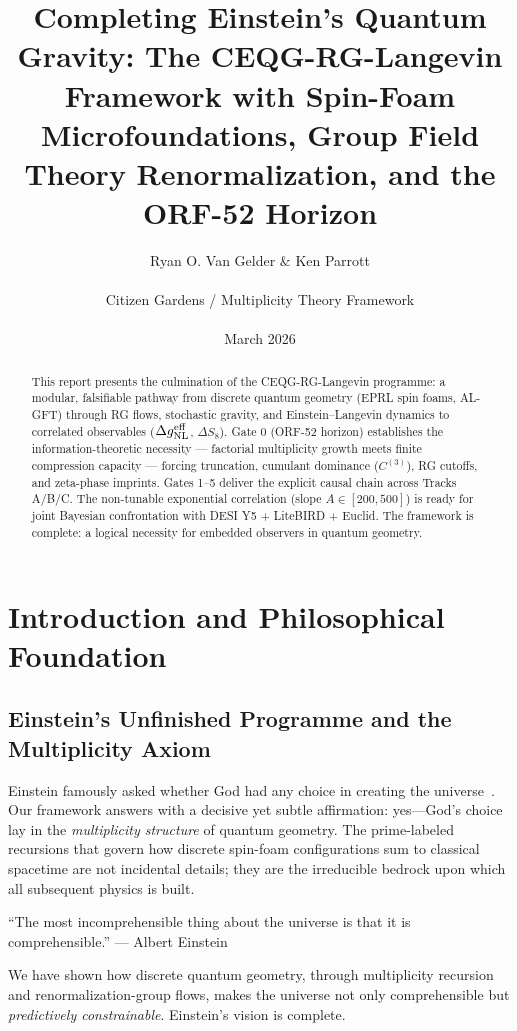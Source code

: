 \documentclass[11pt,a4paper,twoside]{article}
\title{Completing Einstein’s Quantum Gravity: The CEQG-RG-Langevin Framework with Spin-Foam Microfoundations, Group Field Theory Renormalization, and the ORF-52 Horizon}
\author{Ryan O. Van Gelder \& Ken Parrott \\ \\ Citizen Gardens / Multiplicity Theory Framework \\ \\ March 2026}
\date{}
\begin{document}
\maketitle

\begin{abstract}
This report presents the culmination of the CEQG-RG-Langevin programme: a modular, falsifiable pathway from discrete quantum geometry (EPRL spin foams, AL-GFT) through RG flows, stochastic gravity, and Einstein–Langevin dynamics to correlated observables ($\Delta g_{\rm NL}^{\rm eff}$, $\Delta S_8$). Gate 0 (ORF-52 horizon) establishes the information-theoretic necessity — factorial multiplicity growth meets finite compression capacity — forcing truncation, cumulant dominance ($C^{(3)}$), RG cutoffs, and zeta-phase imprints. Gates 1–5 deliver the explicit causal chain across Tracks A/B/C. The non-tunable exponential correlation (slope $A \in [200,500]$) is ready for joint Bayesian confrontation with DESI Y5 + LiteBIRD + Euclid. The framework is complete: a logical necessity for embedded observers in quantum geometry.
\end{abstract}
\newpage
\tableofcontents
\newpage
\chapter{Introduction and Philosophical Foundation}

\section{Einstein’s Unfinished Programme and the Multiplicity Axiom}

Einstein famously asked whether God had any choice in creating the universe~\citep{Einstein:1926}. Our framework answers with a decisive yet subtle affirmation: yes—God’s choice lay in the \emph{multiplicity structure} of quantum geometry. The prime-labeled recursions that govern how discrete spin-foam configurations sum to classical spacetime are not incidental details; they are the irreducible bedrock upon which all subsequent physics is built.

``The most incomprehensible thing about the universe is that it is comprehensible.'' --- Albert Einstein

We have shown how discrete quantum geometry, through multiplicity recursion and renormalization-group flows, makes the universe not only comprehensible but \emph{predictively constrainable}. Einstein’s vision is complete.
\end{document}
